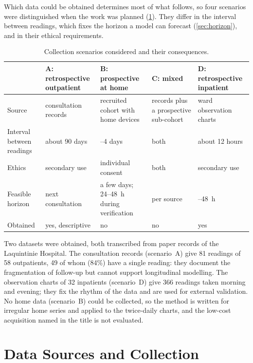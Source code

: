 Which data could be obtained determines most of what follows, so four scenarios were distinguished when the work was planned (\cref{tab:scenarios}). They differ in the interval between readings, which fixes the horizon a model can forecast (\cref{sec:horizon}), and in their ethical requirements.

\begin{table}[htbp]
\centering\footnotesize
\caption{Collection scenarios considered and their consequences.}\label{tab:scenarios}
\begin{tabularx}{\textwidth}{@{}>{\raggedright\arraybackslash}p{2.3cm} >{\raggedright\arraybackslash}X >{\raggedright\arraybackslash}X >{\raggedright\arraybackslash}X >{\raggedright\arraybackslash}X@{}}
\toprule
 & \textbf{A: retrospective outpatient} & \textbf{B: prospective at home} & \textbf{C: mixed} & \textbf{D: retrospective inpatient} \\
\midrule
Source & consultation records & recruited cohort with home devices & records plus a prospective sub-cohort & ward observation charts \\
Interval between readings & about 90 days & 3--4 days & both & about 12 hours \\
Ethics & secondary use & individual consent & both & secondary use \\
Feasible horizon & next consultation & a few days; 24--48~h during verification & per source & 24--48~h \\
Obtained & yes, descriptive & no & no & yes \\
\bottomrule
\end{tabularx}
\end{table}

Two datasets were obtained, both transcribed from paper records of the Laquintinie Hospital. The consultation records (scenario~A) give 81 readings of 58 outpatients, 49 of whom (84\%) have a single reading: they document the fragmentation of follow-up but cannot support longitudinal modelling. The observation charts of 32 inpatients (scenario~D) give 366 readings taken morning and evening; they fix the rhythm of the data and are used for external validation. No home data (scenario~B) could be collected, so the method is written for irregular home series and applied to the twice-daily charts, and the low-cost acquisition named in the title is not evaluated.

\section{Data Sources and Collection}\label{sec:data-collection}\label{sec:collection}\label{sec:datasets}

